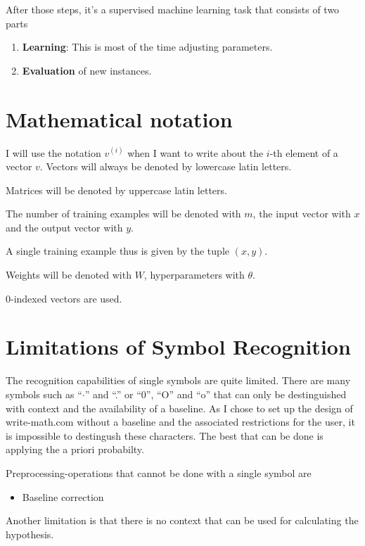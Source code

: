 After those steps, it's a supervised machine learning task that consists of
two parts

\begin{enumerate}
    \item \textbf{Learning}: This is most of the time adjusting parameters.
    \item \textbf{Evaluation} of new instances.
\end{enumerate}

\section{Mathematical notation}
I will use the notation $v^{(i)}$ when I want to write about the $i$-th element
of a vector $v$. Vectors will always be denoted by lowercase latin letters.

Matrices will be denoted by uppercase latin letters.

The number of training examples will be denoted with $m$, the input vector with
$x$ and the output vector with $y$.

A single training example thus is given by the tuple $(x, y)$.

Weights will be denoted with $W$, hyperparameters with $\theta$.

0-indexed vectors are used.

\section{Limitations of Symbol Recognition}
The recognition capabilities of single symbols are quite limited. There are
many symbols such as \enquote{$\cdot$} and \enquote{.} or \enquote{0}, \enquote{O}
and \enquote{o} that can only be destinguished with context and the availability
of a baseline. As I chose to set up the design of write-math.com without a
baseline and the associated %
restrictions for the user, it is impossible to destingush these characters.
The best that can be done is applying the a priori probabilty.

Preprocessing-operations that cannot be done with a single symbol are

\begin{itemize}
    \item Baseline correction
\end{itemize}

Another limitation is that there is no context that can be used for calculating
the hypothesis.